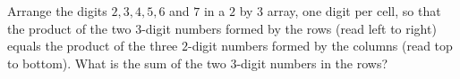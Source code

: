Arrange the digits $2,3,4,5,6$ and $7$ in a $2$ by $3$ array, one digit per cell, so that the product of the two $3$-digit numbers formed by the rows (read left to right) equals the product of the three $2$-digit numbers formed by the columns (read top to bottom). What is the sum of the two $3$-digit numbers in the rows?
